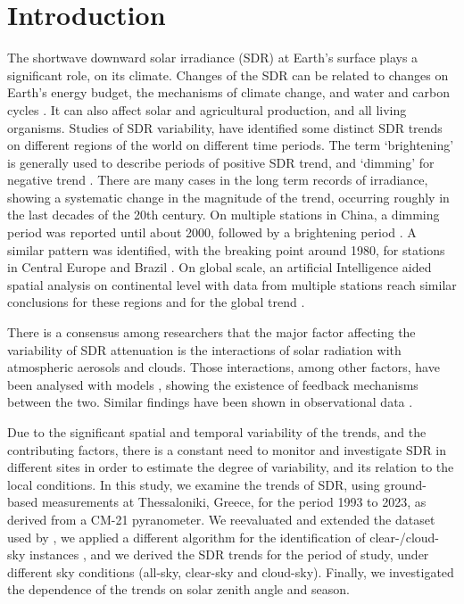 \documentclass[applsci,article,submit,moreauthors,pdftex]{Definitions/mdpi}
\providecommand{\DIFaddbegin}{} %
\providecommand{\DIFaddend}{} %
\providecommand{\DIFdelbegin}{} %
\providecommand{\DIFdelend}{} %
\begin{document}

\DIFdelbegin %
\DIFdelend \DIFaddbegin \hypertarget{introduction}{%
\section{Introduction}\label{introduction}}
\DIFaddend 

The shortwave downward solar irradiance (SDR) at Earth's surface plays a
significant role, on its climate. Changes of the SDR can be related to
changes on Earth's energy budget, the mechanisms of climate change, and
water and carbon cycles \citep{Wild2009}. It can also affect solar and
agricultural production, and all living organisms. Studies of SDR
variability, have identified some distinct SDR trends on different
regions of the world on different time periods. The term `brightening'
is generally used to describe periods of positive SDR trend, and
`dimming' for negative trend \citep{Wild2009}. There are many cases in
the long term records of irradiance, showing a systematic change in the
magnitude of the trend, occurring roughly in the last decades of the
20th century. On multiple stations in China, a dimming period was
reported until about 2000, followed by a brightening period
\citep{Yang2021}. A similar pattern was identified, with the breaking
point around 1980, for stations in Central Europe \citep{Wild2021} and
Brazil \citep{Yamasoe2021}. On global scale, an artificial Intelligence
aided spatial analysis on continental level with data from multiple
stations reach similar conclusions for these regions and for the global
trend \citep{Yuan2021}.

There is a consensus among researchers that the major factor affecting
the variability of SDR attenuation is the interactions of solar
radiation with atmospheric aerosols and clouds. Those interactions,
among other factors, have been analysed with models
\citep{Li2016, Samset2018}, showing the existence of feedback mechanisms
between the two. Similar findings have been shown in observational data
\citep[ and references
therein]{Schwarz2020, Ohvril2009, Zerefos2009, Xia2007}.

Due to the significant spatial and temporal variability of the trends,
and the contributing factors, there is a constant need to monitor and
investigate SDR in different sites in order to estimate the degree of
variability, and its relation to the local conditions. In this study, we
examine the trends of SDR, using ground-based measurements at
Thessaloniki, Greece, for the period 1993 to 2023, as derived from a
CM-21 pyranometer. We reevaluated and extended the dataset used by
\citet{Bais2013}, we applied a different algorithm for the
identification of clear-/cloud-sky instances
\citep{Reno2016, Reno2012a}, and we derived the SDR trends for the
period of study, under different sky conditions (all-sky, clear-sky and
cloud-sky). Finally, we investigated the dependence of the trends on
solar zenith angle and season.
\end{document}
